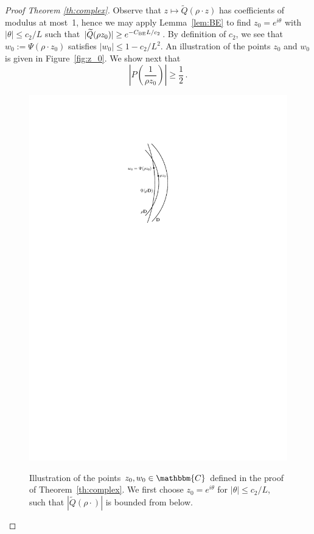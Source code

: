 \documentclass[final,12pt]{colt2018} %
\newcommand{\C}{\mathbbm{C}}
\newcommand{\1}{\mathbf{1}}
\newcommand{\eqb}{\begin{equation}}
\newcommand{\eqe}{\end{equation}}
\newcommand{\wt}{\widetilde}
\def\Qt{{\wt{Q}}}
\def\cbe{C_{\rm BE}}
\begin{document}
\begin{proof}[Proof Theorem \ref{th:complex}]
	Observe that $z \mapsto \Qt (\rho \cdot z)$ has coefficients
	of modulus at most~1, hence we may apply Lemma~\ref{lem:BE} to
	find $z_0 = e^{i\theta}$ with $|\theta| \leq c_2 / L$ such that
	$|\Qt (\rho z_0)| \geq e^{-\cbe L/c_2}$.  By definition of $c_2$,
	we see that $w_0 := \Psi (\rho \cdot z_0)$ satisfies $|w_0| \leq 1-c_2/L^2$.
	An illustration of the points $z_0$ and $w_0$ is given in
	Figure~\ref{fig:z_0}.  We show next that
	\eqb \label{eq:P}
	\left | P \left ( \frac{1}{\rho z_0} \right ) \right | \geq \frac{1}{2} \, .
	\eqe
	\begin{figure}[b]
		\centering
		\includegraphics[scale=1]{circles} \\[2ex]
		\caption{Illustration of the points $z_0,w_0\in\C$ defined in the proof
			of Theorem~\ref{th:complex}.  We first choose $z_0 = e^{i\theta}$
			for $|\theta|\leq c_2/L$, such that $|\wt Q(\rho\cdot)|$ is bounded from below.
}
\end{figure}
\end{proof}
\end{document}
